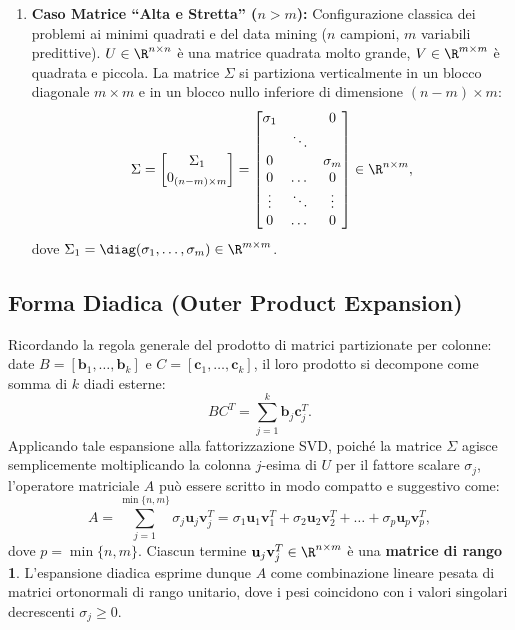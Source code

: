 \begin{enumerate}
    \item \textbf{Caso Matrice ``Alta e Stretta'' ($n > m$):}
    Configurazione classica dei problemi ai minimi quadrati e del data mining ($n$ campioni, $m$ variabili predittive). $U \in \R^{n \times n}$ \`e una matrice quadrata molto grande, $V \in \R^{m \times m}$ \`e quadrata e piccola. La matrice $\Sigma$ si partiziona verticalmente in un blocco diagonale $m \times m$ e in un blocco nullo inferiore di dimensione $(n - m) \times m$:
    \begin{equation}
        \Sigma = \begin{bmatrix} \Sigma_1 \\ 0_{(n - m) \times m} \end{bmatrix} = \begin{bmatrix}
            \sigma_1 & & 0 \\
            & \ddots & \\
            0 & & \sigma_m \\
            0 & \dots & 0 \\
            \vdots & \ddots & \vdots \\
            0 & \dots & 0
        \end{bmatrix} \in \R^{n \times m},
    \end{equation}
    dove $\Sigma_1 = \diag(\sigma_1, \dots, \sigma_m) \in \R^{m \times m}$.
\end{enumerate}

\subsection{Forma Diadica (Outer Product Expansion)}

Ricordando la regola generale del prodotto di matrici partizionate per colonne: date $B = [\mathbf{b}_1, \dots, \mathbf{b}_k]$ e $C = [\mathbf{c}_1, \dots, \mathbf{c}_k]$, il loro prodotto si decompone come somma di $k$ diadi esterne:
\begin{equation}
    B C^T = \sum_{j=1}^k \mathbf{b}_j \mathbf{c}_j^T.
\end{equation}
Applicando tale espansione alla fattorizzazione SVD, poich\'e la matrice $\Sigma$ agisce semplicemente moltiplicando la colonna $j$-esima di $U$ per il fattore scalare $\sigma_j$, l'operatore matriciale $A$ pu\`o essere scritto in modo compatto e suggestivo come:
\begin{equation}
\label{eq:svd-forma-diadica}
    A = \sum_{j=1}^{\min\{n, m\}} \sigma_j \mathbf{u}_j \mathbf{v}_j^T = \sigma_1 \mathbf{u}_1 \mathbf{v}_1^T + \sigma_2 \mathbf{u}_2 \mathbf{v}_2^T + \dots + \sigma_p \mathbf{u}_p \mathbf{v}_p^T,
\end{equation}
dove $p = \min\{n, m\}$. Ciascun termine $\mathbf{u}_j \mathbf{v}_j^T \in \R^{n \times m}$ \`e una \textbf{matrice di rango 1}. L'espansione diadica esprime dunque $A$ come combinazione lineare pesata di matrici ortonormali di rango unitario, dove i pesi coincidono con i valori singolari decrescenti $\sigma_j \ge 0$.

